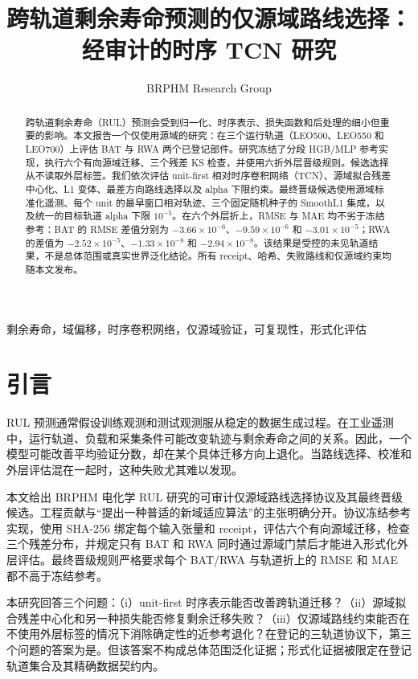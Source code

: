 \documentclass[conference]{IEEEtran}
\title{跨轨道剩余寿命预测的仅源域路线选择：经审计的时序 TCN 研究}
\author{BRPHM Research Group}
\begin{document}
\sloppy
\maketitle

\begin{abstract}
跨轨道剩余寿命（RUL）预测会受到归一化、时序表示、损失函数和后处理的细小但重要的影响。本文报告一个仅使用源域的研究：在三个运行轨道（LEO500、LEO550 和 LEO700）上评估 BAT 与 RWA 两个已登记部件。研究冻结了分段 HGB/MLP 参考实现，执行六个有向源域迁移、三个残差 KS 检查，并使用六折外层晋级规则。候选选择从不读取外层标签。我们依次评估 unit-first 相对时序卷积网络（TCN）、源域拟合残差中心化、L1 变体、最差方向路线选择以及 alpha 下限约束。最终晋级候选使用源域标准化遥测、每个 unit 的最早窗口相对轨迹、三个固定随机种子的 SmoothL1 集成，以及统一的目标轨道 alpha 下限 $10^{-5}$。在六个外层折上，RMSE 与 MAE 均不劣于冻结参考：BAT 的 RMSE 差值分别为 $-3.66\times10^{-6}$、$-9.59\times10^{-6}$ 和 $-3.01\times10^{-5}$；RWA 的差值为 $-2.52\times10^{-5}$、$-1.33\times10^{-8}$ 和 $-2.94\times10^{-8}$。该结果是受控的未见轨道结果，不是总体范围或真实世界泛化结论。所有 receipt、哈希、失败路线和仅源域约束均随本文发布。
\end{abstract}
\begin{IEEEkeywords}
剩余寿命，域偏移，时序卷积网络，仅源域验证，可复现性，形式化评估
\end{IEEEkeywords}

\section{引言}
RUL 预测通常假设训练观测和测试观测服从稳定的数据生成过程。在工业遥测中，运行轨道、负载和采集条件可能改变轨迹与剩余寿命之间的关系。因此，一个模型可能改善平均验证分数，却在某个具体迁移方向上退化。当路线选择、校准和外层评估混在一起时，这种失败尤其难以发现。

本文给出 BRPHM 电化学 RUL 研究的可审计仅源域路线选择协议及其最终晋级候选。工程贡献与“提出一种普适的新域适应算法”的主张明确分开。协议冻结参考实现，使用 SHA-256 绑定每个输入张量和 receipt，评估六个有向源域迁移，检查三个残差分布，并规定只有 BAT 和 RWA 同时通过源域门禁后才能进入形式化外层评估。最终晋级规则严格要求每个 BAT/RWA 与轨道折上的 RMSE 和 MAE 都不高于冻结参考。

本研究回答三个问题：（i）unit-first 时序表示能否改善跨轨道迁移？（ii）源域拟合残差中心化和另一种损失能否修复剩余迁移失败？（iii）仅源域路线约束能否在不使用外层标签的情况下消除确定性的近参考退化？在登记的三轨道协议下，第三个问题的答案为是。但该答案不构成总体范围泛化证据；形式化证据被限定在登记轨道集合及其精确数据契约内。
\end{document}

